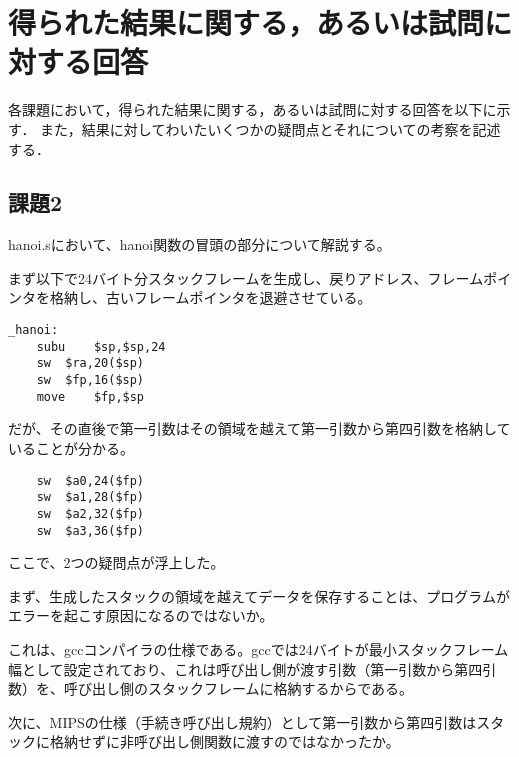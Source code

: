 \documentclass[a4j]{jarticle}
\begin{document}
%
%

\section{得られた結果に関する，あるいは試問に対する回答}


各課題において，得られた結果に関する，あるいは試問に対する回答を以下に示す．
また，結果に対してわいたいくつかの疑問点とそれについての考察を記述する．



\subsection{課題2}


hanoi.sにおいて、hanoi関数の冒頭の部分について解説する。

まず以下で24バイト分スタックフレームを生成し、戻りアドレス、フレームポインタを格納し、古いフレームポインタを退避させている。

\begin{verbatim} 
_hanoi:
	subu	$sp,$sp,24
	sw	$ra,20($sp)
	sw	$fp,16($sp)
	move	$fp,$sp
\end{verbatim}

だが、その直後で第一引数はその領域を越えて第一引数から第四引数を格納していることが分かる。

\begin{verbatim} 
	sw	$a0,24($fp)
	sw	$a1,28($fp)
	sw	$a2,32($fp)
	sw	$a3,36($fp)
\end{verbatim} 

ここで、2つの疑問点が浮上した。

まず、生成したスタックの領域を越えてデータを保存することは、プログラムがエラーを起こす原因になるのではないか。

これは、gccコンパイラの仕様である。gccでは24バイトが最小スタックフレーム幅として設定されており、これは呼び出し側が渡す引数（第一引数から第四引数）を、呼び出し側のスタックフレームに格納するからである。

次に、MIPSの仕様（手続き呼び出し規約）として第一引数から第四引数はスタックに格納せずに非呼び出し側関数に渡すのではなかったか。
\end{document}
